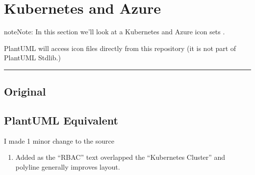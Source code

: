 \documentclass[letterpaper,10pt,english]{sphinxmanual}
\begin{document}
\section{Kubernetes and Azure}
\label{\detokenize{kubernetes/kubernetes:kubernetes-and-azure}}\label{\detokenize{kubernetes/kubernetes::doc}}
\begin{sphinxadmonition}{note}{Note:}
In this section we’ll look at a Kubernetes and Azure icon sets .

PlantUML will access icon files directly from this repository (it is not part of PlantUML Stdlib.)
\end{sphinxadmonition}


\bigskip\hrule\bigskip



\subsection{Original}
\label{\detokenize{kubernetes/kubernetes:original}}
\begin{figure}[htbp]
\centering

\noindent{}
\end{figure}


\subsection{PlantUML Equivalent}
\label{\detokenize{kubernetes/kubernetes:plantuml-equivalent}}
I made 1 minor change to the source
\begin{enumerate}
%
\item {} 
Added  as the “RBAC” text overlapped the “Kubernetes Cluster” and polyline generally improves layout.

\end{enumerate}

\begin{figure}[htbp]
\centering

\end{figure}
\end{document}
